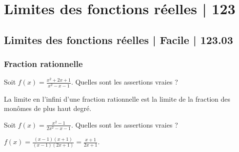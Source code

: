 



\section{Limites des fonctions réelles | 123}


\subsection{Limites des fonctions réelles | Facile | 123.03}


\subsubsection{Fraction rationnelle}
 
\begin{question} 
Soit $f(x)= \frac{x^2+2x+1}{x^2-x-1}$. Quelles sont les assertions vraies ?
\begin{answers}



\end{answers}
\begin{explanations}
La limite en l'infini d'une fraction rationnelle est la limite de la fraction des monômes de plus haut degré.

  
\end{explanations}

\end{question}


\begin{question} 
Soit $f(x)= \frac{x^2-1}{2x^2-x-1}$. Quelles sont les assertions vraies ?
\begin{answers}



\end{answers}
\begin{explanations}
$f(x)=\frac{(x-1)(x+1)}{(x-1)(2x+1)}= \frac{x+1}{2x+1}$.
\end{explanations}

\end{question}


